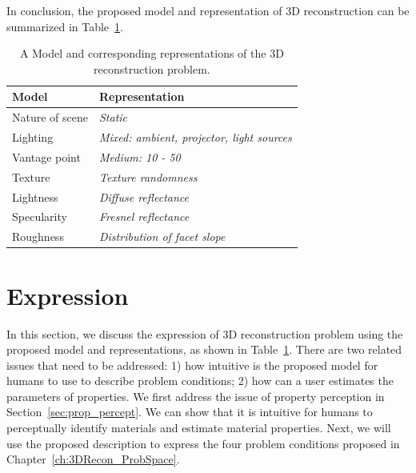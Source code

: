 In conclusion, the proposed model and representation of 3D reconstruction can be summarized in Table~\ref{tab:3DRecon_model_repre}.
\begin{table}[!htbp]
  \centering
  \begin{tabular}{l|l}
  \toprule
  \textbf{Model} & \textbf{Representation}\\
  \midrule
  Nature of scene & \textit{Static} \\
  Lighting & \textit{Mixed: ambient, projector, light sources} \\
  Vantage point & \textit{Medium: 10 - 50} \\
  Texture & \textit{Texture randomness}\\
  Lightness & \textit{Diffuse reflectance}\\
  Specularity & \textit{Fresnel reflectance}\\
  Roughness & \textit{Distribution of facet slope}\\
  \bottomrule
  \end{tabular}
  \caption{A Model and corresponding representations of the 3D reconstruction problem.}
  \label{tab:3DRecon_model_repre}
\end{table}

\section{Expression}
\label{sec:3DRecon_Exp}
In this section, we discuss the expression of 3D reconstruction problem using the proposed model and representations, as shown in Table~\ref{tab:3DRecon_model_repre}. There are two related issues that need to be addressed: 1) how intuitive is the proposed model for humans to use to describe problem conditions; 2) how can a user estimates the parameters of properties. We first address the issue of property perception in Section~\ref{sec:prop_percept}. We can show that it is intuitive for humans to perceptually identify materials and estimate material properties. Next, we will use the proposed description to express the four problem conditions proposed in Chapter~\ref{ch:3DRecon_ProbSpace}.

